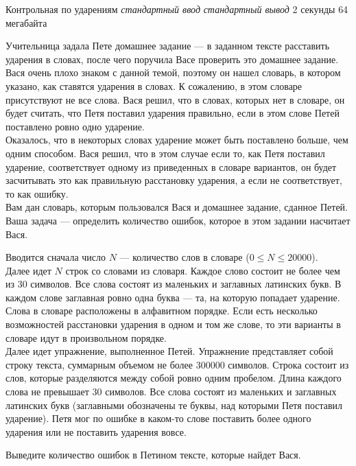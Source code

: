 \begin{problem}%
{Контрольная по ударениям}%
{\textsl{стандартный ввод}}%
{\textsl{стандартный вывод}}%
{2 секунды}%
{64 мегабайта}%
{}

Учительница задала Пете домашнее задание — в заданном тексте расставить ударения в словах, после чего поручила Васе проверить это домашнее задание. Вася очень плохо знаком с данной темой, поэтому он нашел словарь, в котором указано, как ставятся ударения в словах. К сожалению, в этом словаре присутствуют не все слова. Вася решил, что в словах, которых нет в словаре, он будет считать, что Петя поставил ударения правильно, если в этом слове Петей поставлено ровно одно ударение.\\

Оказалось, что в некоторых словах ударение может быть поставлено больше, чем одним способом. Вася решил, что в этом случае если то, как Петя поставил ударение, соответствует одному из приведенных в словаре вариантов, он будет засчитывать это как правильную расстановку ударения, а если не соответствует, то как ошибку.\\

Вам дан словарь, которым пользовался Вася и домашнее задание, сданное Петей. Ваша задача — определить количество ошибок, которое в этом задании насчитает Вася.\\

\InputFile

Вводится сначала число $N$ — количество слов в словаре ($0 \le N \le 20000$).\\

Далее идет $N$ строк со словами из словаря. Каждое слово состоит не более чем из $30$ символов. Все слова состоят из маленьких и заглавных латинских букв. В каждом слове заглавная ровно одна буква — та, на которую попадает ударение. Слова в словаре расположены в алфавитном порядке. Если есть несколько возможностей расстановки ударения в одном и том же слове, то эти варианты в словаре идут в произвольном порядке.\\

Далее идет упражнение, выполненное Петей. Упражнение представляет собой строку текста, суммарным объемом не более $300000$ символов. Строка состоит из слов, которые разделяются между собой ровно одним пробелом. Длина каждого слова не превышает $30$ символов. Все слова состоят из маленьких и заглавных латинских букв (заглавными обозначены те буквы, над которыми Петя поставил ударение). Петя мог по ошибке в каком-то слове поставить более одного ударения или не поставить ударения вовсе.

\OutputFile

Выведите количество ошибок в Петином тексте, которые найдет Вася.

\Examples

\begin{example}
%
%
\end{example}
\end{problem}
